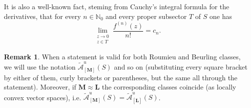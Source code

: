 \documentclass[11pt,a4paper]{article}
\theoremstyle{plain}
\theoremstyle{definition}
\newtheorem{remark}[proposition]{Remark}
\newcommand{\NN}{\mathbb{N}}
\newcommand{\M}{\mathbf{M}}
\newcommand{\LL}{\mathbf{L}}
\let\on=\operatorname
\begin{document}
It is also a well-known fact, steming from Cauchy's integral formula for the derivatives, that for every $n\in\NN_0$ and every proper subsector $T$ of $S$ one has
\begin{equation}\label{eq.limit.derivatives.coeff}
\lim_{\substack{z\to 0\\z\in T}}\frac{f^{(n)}(z)}{n!}=c_n.    
\end{equation}

\begin{remark}
%	
	When a statement is valid for both Roumieu and Beurling classes, we will use the notation $\widetilde{\mathcal{A}}^u_{[\M]}(S)$ and so on (substituting every square bracket by either of them, curly brackets or parentheses, but the same all through the statement). Moreover, if $\M\approx\LL$ the corresponding classes coincide (as locally convex vector spaces), i.e. $\widetilde{\mathcal{A}}^u_{[\M]}(S)=\widetilde{\mathcal{A}}^u_{[\LL]}(S)$.
	
\end{remark}	
%
%

\end{document}
